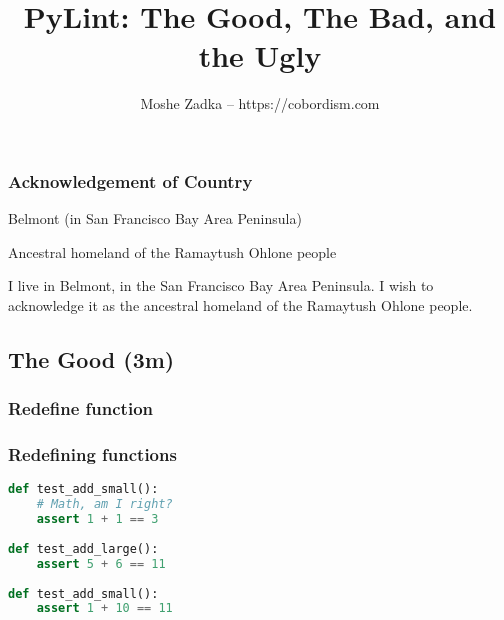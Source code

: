 \usepackage{hyperref}
\usepackage{graphicx}
\usepackage{listings}
\usepackage{textcomp}
\usepackage{fancyvrb}

\newcommand{\passthrough}[1]{\lstset{mathescape=false}#1\lstset{mathescape=true}}
\newcommand{\tightlist}{}

\title{PyLint: The Good, The Bad, and the Ugly}
\author{Moshe Zadka -- https://cobordism.com}
\date{}


\begin{titlepage}
\maketitle
\end{titlepage}

\frame{\titlepage}

\begin{frame}
\frametitle{Acknowledgement of Country}

Belmont (in San Francisco Bay Area Peninsula)

Ancestral homeland of the Ramaytush Ohlone people

\end{frame}

I live in Belmont, in the San Francisco Bay Area Peninsula. I wish to
acknowledge it as the ancestral homeland of the Ramaytush Ohlone people.

\hypertarget{the-good-3m}{%
\subsection{The Good (3m)}\label{the-good-3m}}

\hypertarget{redefine-function}{%
\subsubsection{Redefine function}\label{redefine-function}}

\begin{frame}[fragile]
\frametitle{Redefining functions}

\begin{lstlisting}[language=Python]
def test_add_small():
    # Math, am I right?
    assert 1 + 1 == 3
    
def test_add_large():
    assert 5 + 6 == 11
    
def test_add_small():
    assert 1 + 10 == 11
\end{lstlisting}

\end{frame}

